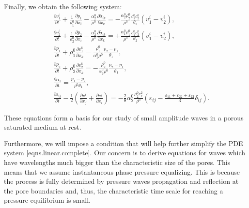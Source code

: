 \documentclass[3p,times,table]{article}
\begin{document}
Finally, we obtain the following system: 
\begin{subequations}\label{eqns.linear.complete}
	\begin{eqnarray}
&&\frac{\partial v^i_1}{\partial t}+
\frac{1}{\rho_1^0}\frac{\partial p_1}{\partial x_i}- \frac{\alpha_2^0}{\rho^0}
\frac{\partial \tilde \sigma_{ik}}{\partial x_k}
=-\frac{\alpha_2^0 \rho_2^0}{\rho^0}\frac{c_1^0c_2^0}{\theta_2}(v_1^i-v_2^i), 
 \\
&&\frac{\partial v^i_2}{\partial t}+
\frac{1}{\rho_2^0}\frac{\partial p_2}{\partial x_i}- \frac{\alpha_2^0}{\rho^0}
\frac{\partial \tilde \sigma_{ik}}{\partial x_k}
=+\frac{\alpha_1^0 \rho_1^0}{\rho^0}\frac{c_1^0c_2^0}{\theta_2}(v_1^i-v_2^i), 
 \\
%
&&\frac{\partial \rho_1}{\partial t}+\rho_1^0 \frac{\partial v^k_1}{\partial 
x_k}=
\frac{\rho_1^0}{\alpha_1^0 \rho^0} \frac{p_2-p_1}{\theta_1},   \\
&&\frac{\partial \rho_2}{\partial t}+\rho_2^0 \frac{\partial v^k_2}{\partial 
x_k}=
-\frac{\rho_2^0}{\alpha_2^0 \rho^0} \frac{p_2-p_1}{\theta_1},   \\
&&\frac{\partial \alpha_1}{\partial t}= \frac{p_1-p_2}{\rho^0 \theta_1},  
 \\
&&\frac{\partial \varepsilon_{ij}}{\partial t} - 
\frac{1}{2}\left(\frac{\partial v^i}{\partial x_j}+\frac{\partial v^j}{\partial 
x_i} \right) = 
-\frac{2}{\theta}\alpha_2^0 \frac{\rho_2^0 c^2_s}{\rho^0} 
\left(\varepsilon_{ij}-\frac{\varepsilon_{11}+\varepsilon_{22}+\varepsilon_{22}}{3}\delta_{ij}\right).
  \end{eqnarray}
\end{subequations}

These equations form a basis for our study of small amplitude waves in
a porous saturated medium at rest. 

Furthermore, we will impose a condition that will help further simplify the PDE 
system \eqref{eqns.linear.complete}. Our concern is to derive equations for 
waves which have 
wavelengths  much bigger than the characteristic size of the pores. 
This means that we assume instantaneous phase pressure equalizing. This 
is because the process is fully determined by pressure waves 
propagation and reflection at the pore boundaries and, thus, the 
characteristic time scale for reaching a pressure equilibrium is small.
\end{document}
